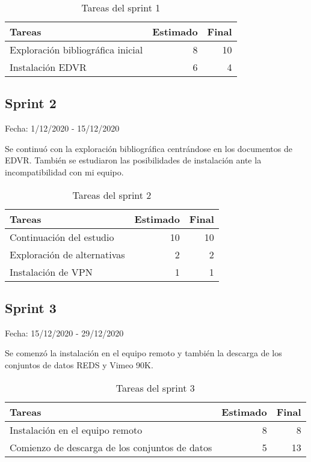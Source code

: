 	\begin{table}[H]
		 \begin{tabularx}{\linewidth}{X r r}
		 	\toprule \textbf{Tareas} & \textbf{Estimado} & \textbf{Final}\\
		 	\toprule
		 	Exploración bibliográfica inicial & 8 & 10 \\
		 	Instalación EDVR  & 6 & 4 \\
		 	\bottomrule
		 \end{tabularx}
		 \caption{Tareas del sprint 1}
	\end{table}

\subsection{Sprint 2}
    Fecha: 1/12/2020 - 15/12/2020

    Se continuó con la exploración bibliográfica centrándose en los documentos de EDVR. También se estudiaron las posibilidades de instalación ante la incompatibilidad con mi equipo.


    \begin{table}[H]
    	 \begin{tabularx}{\linewidth}{X r r}
    	 	\toprule \textbf{Tareas} & \textbf{Estimado} & \textbf{Final}\\
    	 	\toprule
            Continuación del estudio & 10 & 10 \\
         	Exploración de alternativas & 2 & 2 \\
            Instalación de VPN & 1 & 1 \\
    	 	\bottomrule
    	 \end{tabularx}
    	 \caption{Tareas del sprint 2}
    \end{table}
    
\subsection{Sprint 3}

    Fecha: 15/12/2020 - 29/12/2020
    
    Se comenzó la instalación en el equipo remoto y también la descarga de los conjuntos de datos REDS y Vimeo 90K.
    
    \begin{table}[H]
    	 \begin{tabularx}{\linewidth}{X r r}
    	 	\toprule \textbf{Tareas} & \textbf{Estimado} & \textbf{Final}\\
    	 	\toprule
            Instalación en el equipo remoto & 8 & 8 \\
         	Comienzo de descarga de los conjuntos de datos  & 5 & 13 \\
    	 	\bottomrule
    	 \end{tabularx}
    	 \caption{Tareas del sprint 3}
    \end{table}

